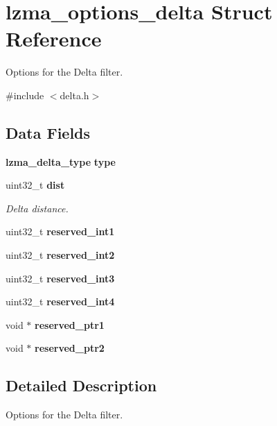 \section{lzma\-\_\-options\-\_\-delta Struct Reference}
\label{structlzma__options__delta}


Options for the Delta filter.  




{\ttfamily \#include $<$delta.\-h$>$}

\subsection*{Data Fields}
\begin{DoxyCompactItemize}
\item 
{\bf lzma\-\_\-delta\-\_\-type} {\bf type}
\item 
uint32\-\_\-t {\bf dist}
\begin{DoxyCompactList}\small\item\em Delta distance. \end{DoxyCompactList}\item 
uint32\-\_\-t {\bfseries reserved\-\_\-int1}\label{structlzma__options__delta_abbe5fee79483b461fa4f1927f41e9158}

\item 
uint32\-\_\-t {\bfseries reserved\-\_\-int2}\label{structlzma__options__delta_a3058d5a85518e40b8e3ed7d5e64527ec}

\item 
uint32\-\_\-t {\bfseries reserved\-\_\-int3}\label{structlzma__options__delta_a01e600ee62cd1e82e353c7c8adbe23ea}

\item 
uint32\-\_\-t {\bfseries reserved\-\_\-int4}\label{structlzma__options__delta_a3c34fcc33c70e225996a34621ab28828}

\item 
void $\ast$ {\bfseries reserved\-\_\-ptr1}\label{structlzma__options__delta_ad3ffc87036cd62596f384d642e1e5f4d}

\item 
void $\ast$ {\bfseries reserved\-\_\-ptr2}\label{structlzma__options__delta_ac2cf28cd8660b13324802badf4b0f1f0}

\end{DoxyCompactItemize}


\subsection{Detailed Description}
Options for the Delta filter. 

